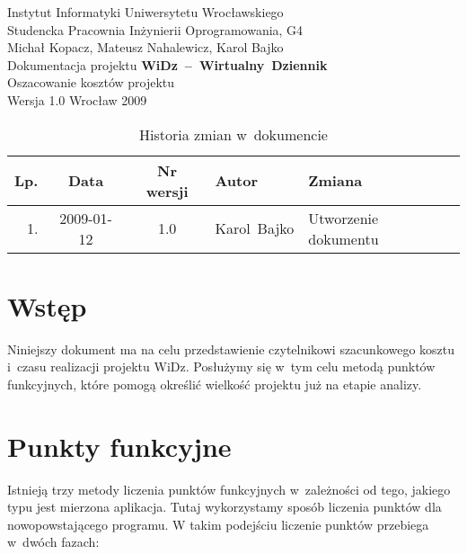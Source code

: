 \documentclass[12pt,leqno,twoside]{mwart}
\begin{document}
\begin{titlepage}
\begin{center}
Instytut Informatyki Uniwersytetu Wrocławskiego \\
Studencka Pracownia Inżynierii Oprogramowania, G4 \\
\vspace{4cm}
\Large Michał Kopacz, Mateusz Nahalewicz, Karol Bajko \\
\vspace{0.5cm}
\huge Dokumentacja projektu \mbox{\textbf{WiDz -- Wirtualny Dziennik}} \\ \Large Oszacowanie kosztów projektu\\
\vspace{1cm}
\normalsize Wersja 1.0
\vfill
\normalsize Wrocław 2009
\end{center}
\end{titlepage}

\newpage
\vfill
\renewcommand*{\tablename}{Tabela}
\begin{table}[tb]
	\centering
	\caption{Historia zmian w~dokumencie}
		\begin{tabular}{|r|c|c|p{}|l|}
		\hline
		Lp. 	& Data       & Nr wersji 	& Autor           		& Zmiana \\ \hline
		1.   	& 2009-01-12 & 1.0       	& \mbox{Karol Bajko} & Utworzenie dokumentu \\ \hline
		\end{tabular}
\end{table}

\tableofcontents
\newpage

\section{Wstęp}
\noindent Niniejszy dokument ma na celu przedstawienie czytelnikowi szacunkowego kosztu i~czasu realizacji projektu WiDz. Posłużymy się w~tym celu metodą punktów funkcyjnych, które pomogą określić wielkość projektu już na etapie analizy.

\section{Punkty funkcyjne}
\noindent Istnieją trzy metody liczenia punktów funkcyjnych w~zależności od tego, jakiego typu jest mierzona aplikacja. Tutaj wykorzystamy sposób liczenia punktów dla nowopowstającego programu. W takim podejściu liczenie punktów przebiega w~dwóch fazach:
\end{document}

